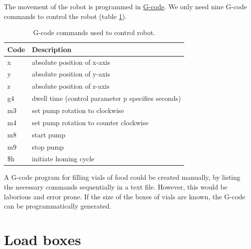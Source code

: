 \documentclass[]{book}
\theoremstyle{definition}
\theoremstyle{definition}
\theoremstyle{remark}
\begin{document}
The movement of the robot is programmed in
\href{https://en.wikipedia.org/wiki/G-code}{G-code}. We only need nine
G-code commands to control the robot (table \ref{tab:gCodes}).

\begin{table}

\caption{\label{tab:gCodes}G-code commands used to control robot.}
\centering
\begin{tabular}[t]{ll}
\toprule
Code & Description\\
\midrule
x & absolute position of x-axis\\
y & absolute position of y-axis\\
z & absolute position of z-axis\\
g4 & dwell time (control parameter p specifies seconds)\\
m3 & set pump rotation to clockwise\\
\addlinespace
m4 & set pump rotation to counter clockwise\\
m8 & start pump\\
m9 & stop pump\\
\$h & initiate homing cycle\\
\bottomrule
\end{tabular}
\end{table}

A G-code program for filling vials of food could be created manually, by
listing the necessary commands sequentially in a text file. However,
this would be laborious and error prone. If the size of the boxes of
vials are known, the G-code can be programmatically generated.

\section{Load boxes}\label{loadBoxes}
\end{document}
